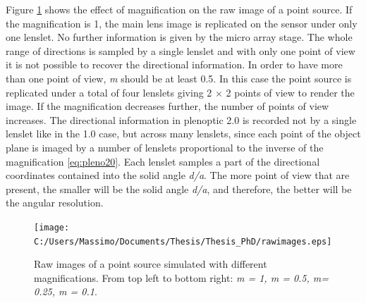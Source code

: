   Figure \ref{fig:rawpleno201} shows the effect of magnification on the raw image of a point source. If the magnification is 1, the main lens image is replicated on the sensor under only one lenslet. No further information is given by the micro array stage. The whole range of directions is sampled by a single lenslet and with only one point of view it is not possible to recover the directional information. In order to have more than one point of view, \textit{m} should be at least 0.5. In this case the point source is replicated under a total of four lenslets giving 2 $\times$ 2 points of view to render the image. If the magnification decreases further, the number of points of view increases. The directional information in plenoptic 2.0 is recorded not by a single lenslet like in the 1.0 case, but across many lenslets, since each point of the object plane is imaged by a number of lenslets proportional to the inverse of the magnification \ref{eq:pleno20}. Each lenslet samples a part of the directional coordinates contained into the solid angle \textit{d/a}. The more point of view that are present, the smaller will be the solid angle \textit{d/a}, and therefore, the better will be the angular resolution. \cite{lumsdaine2009focused}
   \begin{figure}[H]
  	\centering
  	\texttt{[image: C:/Users/Massimo/Documents/Thesis/Thesis\_PhD/rawimages.eps]}
  	\caption{\label{fig:rawpleno201}Raw images of a point source simulated with different magnifications. From top left to bottom right: \textit{m = 1, m = 0.5, m= 0.25, m = 0.1}. }
  \end{figure}
  \newpage
